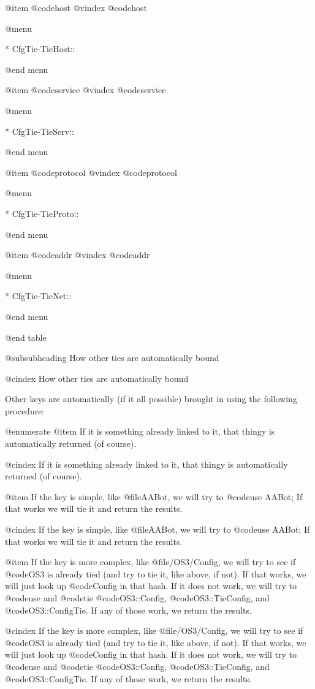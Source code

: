 @item @code{host}
@vindex @code{host}


@menu

* CfgTie-TieHost::	


@end menu

@item @code{service}
@vindex @code{service}


@menu

* CfgTie-TieServ::	


@end menu

@item @code{protocol}
@vindex @code{protocol}


@menu

* CfgTie-TieProto::	


@end menu

@item @code{addr}
@vindex @code{addr}


@menu

* CfgTie-TieNet::	


@end menu

@end table

@subsubheading How other ties are automatically bound

@cindex How other ties are automatically bound

Other keys are automatically (if it all possible) brought in using the
following procedure:

@enumerate 
@item
If it is something already linked to it, that thingy is automatically returned (of course).

@cindex If it is something already linked to it, that thingy is automatically returned (of course).

@item
If the key is simple, like @file{AABot}, we will try to @code{use AABot;} If that works we will tie it and return the results.

@cindex If the key is simple, like @file{AABot}, we will try to @code{use AABot;} If that works we will tie it and return the results.

@item
If the key is more complex, like @file{/OS3/Config}, we will try to see if @code{OS3} is already tied (and try to tie it, like above, if not).  If that works, we will just look up @code{Config} in that hash.  If it does not work, we will try to @code{use} and @code{tie} @code{OS3::Config}, @code{OS3::TieConfig}, and @code{OS3::ConfigTie}.  If any of those work, we return the results.

@cindex If the key is more complex, like @file{/OS3/Config}, we will try to see if @code{OS3} is already tied (and try to tie it, like above, if not).  If that works, we will just look up @code{Config} in that hash.  If it does not work, we will try to @code{use} and @code{tie} @code{OS3::Config}, @code{OS3::TieConfig}, and @code{OS3::ConfigTie}.  If any of those work, we return the results.

